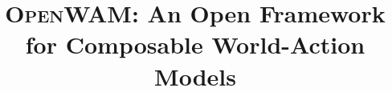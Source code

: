 \documentclass[10pt,twocolumn,letterpaper]{stanford}
\title{
    \textsc{OpenWAM}: An Open Framework for Composable World-Action Models
}
\author[*]{\text{Heng Yu}}
\author[*]{\text{David D. Yuan}}
\author[*]{\text{Juze Zhang}}
\author{\text{Changan Chen}}
\author{\text{Yao Feng}}
\author{\text{Michelle Baldonado}}
\author{\text{Steve Cousins}}
\author{\text{Li Fei-Fei}}
\author{\text{Jiajun Wu}}
\author{\text{Ehsan Adeli}}
\affiliation{Stanford University}
\begin{document}
    

\maketitle








{
    \small
    
    
}


\end{document}
